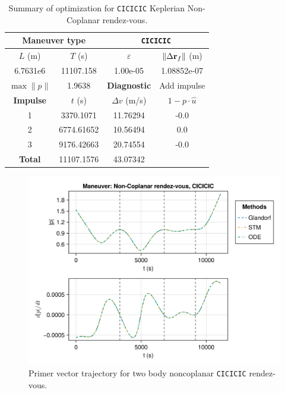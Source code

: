 \begin{table}[htpb]
    \centering
    \begin{tabular}{cccc} \toprule
    \multicolumn{2}{c}{\textbf{Maneuver type}} & \multicolumn{2}{c}{\texttt{CICICIC}} \\ \midrule
    \(L\) (m) & \(T\) (s) & \(\varepsilon\) & \(\lVert \Delta \mathbf{r}_{f} \rVert\) (m)    \\ \midrule
    6.7631e6          & 11107.158          & 1.00e-05                & 1.08852e-07                        \\ \midrule
    \(\max \lVert p \rVert\) & 1.9638     & \textbf{Diagnostic}   & Add impulse        \\ \midrule
    \textbf{Impulse} & \(t\) (s) & \(\Delta v\) (m/s) & \(1 - p \cdot \hat{u}\) \\ \midrule
    1                 & 3370.1071          & 11.76294             & -0.0                    \\
    2                 & 6774.61652          & 10.56494             & 0.0                    \\
    3                 & 9176.42663          & 20.74554             & -0.0                    \\\midrule
    \textbf{Total}   & 11107.1576          & 43.07342             &                     \\ \bottomrule   
    \end{tabular}
    \caption{Summary of optimization for \texttt{CICICIC} Keplerian Non-Coplanar rendez-vous.}
    \label{tab:tb_nr_CICICIC_tab}
\end{table}

\begin{figure}[htbp]
    \centering
    \includegraphics[width=\linewidth]{../results/two_body/ipv_noncop/CICICIC_primer_vector.png}
    \caption{Primer vector trajectory for two body noncoplanar \texttt{CICICIC} rendez-vous.}
    \label{fig:tb_ncop_CICICIC_pv}
\end{figure}

